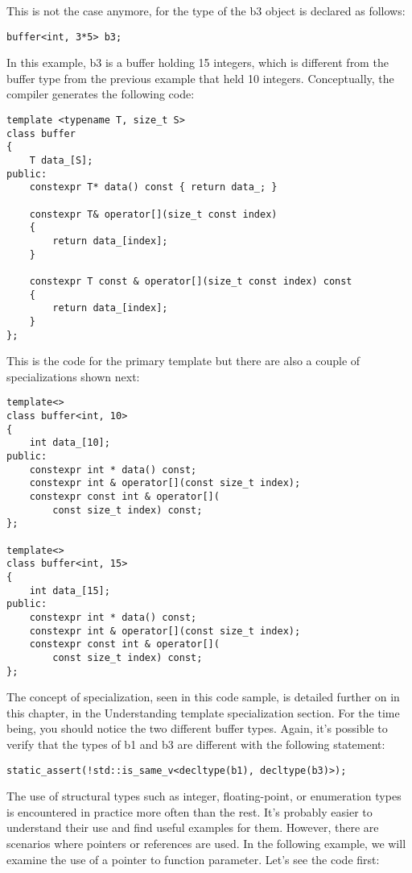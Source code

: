 This is not the case anymore, for the type of the b3 object is declared as follows:

\begin{lstlisting}[style=styleCXX]
buffer<int, 3*5> b3;
\end{lstlisting}

In this example, b3 is a buffer holding 15 integers, which is different from the buffer type from the previous example that held 10 integers. Conceptually, the compiler generates the following code:

\begin{lstlisting}[style=styleCXX]
template <typename T, size_t S>
class buffer
{
	T data_[S];
public:
	constexpr T* data() const { return data_; }
	
	constexpr T& operator[](size_t const index)
	{
		return data_[index];
	}

	constexpr T const & operator[](size_t const index) const
	{
		return data_[index];
	}
};
\end{lstlisting}

This is the code for the primary template but there are also a couple of specializations shown next:

\begin{lstlisting}[style=styleCXX]
template<>
class buffer<int, 10>
{
	int data_[10];
public:
	constexpr int * data() const;
	constexpr int & operator[](const size_t index);
	constexpr const int & operator[](
		const size_t index) const;
};

template<>
class buffer<int, 15>
{
	int data_[15];
public:
	constexpr int * data() const;
	constexpr int & operator[](const size_t index);
	constexpr const int & operator[](
		const size_t index) const;
};
\end{lstlisting}

The concept of specialization, seen in this code sample, is detailed further on in this chapter, in the Understanding template specialization section. For the time being, you should notice the two different buffer types. Again, it's possible to verify that the types of b1 and b3 are different with the following statement:

\begin{lstlisting}[style=styleCXX]
static_assert(!std::is_same_v<decltype(b1), decltype(b3)>);
\end{lstlisting}

The use of structural types such as integer, floating-point, or enumeration types is encountered in practice more often than the rest. It's probably easier to understand their use and find useful examples for them. However, there are scenarios where pointers or references are used. In the following example, we will examine the use of a pointer to function parameter. Let's see the code first:

